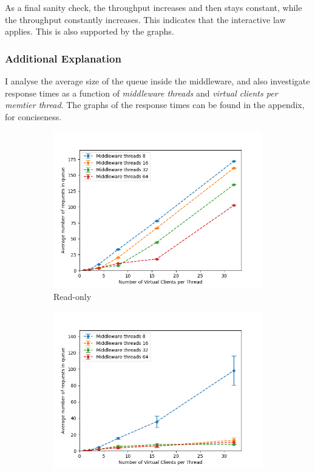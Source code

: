 \documentclass[11pt,a4paper]{article}
\begin{document}
As a final sanity check, the throughput increases and then stays constant, while the throughput constantly increases.
This indicates that the interactive law applies.
This is also supported by the graphs.

\subsubsection{Additional Explanation}

I analyse the average size of the queue inside the middleware, and also investigate response times as a function of \textit{middleware threads} and \textit{virtual clients per memtier thread}.
The graphs of the response times can be found in the appendix, for conciseness.

\begin{figure}[H]
\centering
\begin{subfigure}{.5\textwidth}
    \centering
    \includegraphics[width=\textwidth]{img/exp3_1/exp3_1__queuesize_middleware_write_0.png}
    \caption{Read-only}
    \label{fig:mesh1}
\end{subfigure}%
\begin{subfigure}{.5\textwidth}
      \centering
    \includegraphics[width=\textwidth]{img/exp3_1/exp3_1__queuesize_middleware_write_1.png}

\end{subfigure}
\end{figure}
\end{document}
